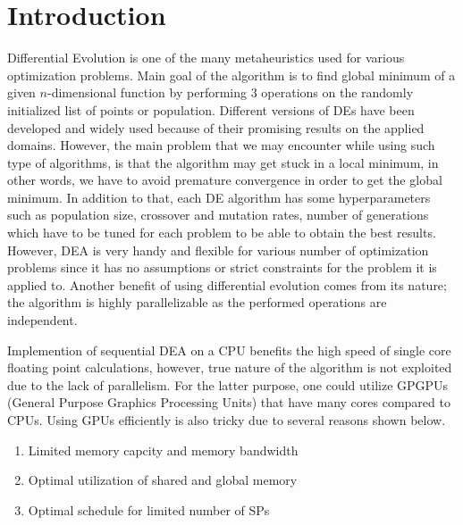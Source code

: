 \documentclass[conference]{IEEEtran}
\begin{document}
\section{Introduction}
Differential Evolution is one of the many metaheuristics used for various optimization problems. Main goal of the algorithm is to find global minimum of a given $n$-dimensional function by performing 
3 operations on the randomly initialized list of points or population. Different versions of DEs have been developed and widely used because of their promising results on the applied domains. However, 
the main problem that we may encounter while using such type of algorithms, is that the algorithm may get stuck in a local minimum, in other words, we have to avoid premature convergence in order to 
get the global minimum. In addition to that, each DE algorithm has some hyperparameters such as population size, crossover and mutation rates, number of generations which have to be tuned for each 
problem to be able to obtain the best results. However, DEA is very handy and flexible for various number of optimization problems since it has no assumptions or strict constraints for the problem 
it is applied to. Another benefit of using differential evolution comes from its nature; the algorithm is highly parallelizable as the performed operations are independent.

Implemention of sequential DEA on a CPU benefits the high speed of single core floating point calculations, however, true nature of the algorithm is not exploited due to the lack of parallelism. 
For the latter purpose, one could utilize GPGPUs (General Purpose Graphics Processing Units) that have many cores compared to CPUs. Using GPUs efficiently is also tricky due to several reasons shown below.

\begin{enumerate}
	\item Limited memory capcity and memory bandwidth
	\item Optimal utilization of shared and global memory
	\item Optimal schedule for limited number of SPs
\end{enumerate}
\end{document}
